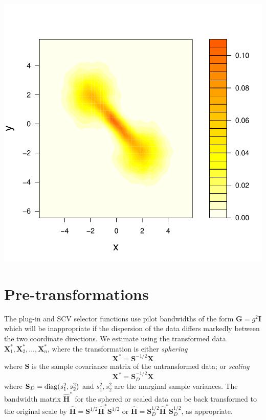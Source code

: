 \documentclass[a4paper,11pt]{article}
\renewcommand{\vec}[1]{\boldsymbol{#1}}
\newcommand{\mat}[1]{\mathbf{#1}}
\def\HH{\mat{H}}
\begin{document}
\begin{center}  
\includegraphics{kde-025}
\end{center}


\section{Pre-transformations}
\label{sec:pre}
The plug-in and SCV selector functions use pilot bandwidths of the 
form $\mat{G} = g^2 \mat{I}$ which will be 
inappropriate if the dispersion of the data differs 
markedly between the two coordinate 
directions. We estimate using the transformed data 
$\vec{X}_1^*, \vec{X}_2^*, 
\dots, \vec{X}_n^*$, where the transformation is either {\em sphering} 
$$\vec{X}^*= \mat{S}^{-1/2} \vec{X}$$
where $\mat{S}$ is the sample covariance matrix of the untransformed data; 
or {\em scaling}
$$\vec{X}^*= \mat{S}_D^{-1/2} \vec{X}$$
where $\mat{S}_D = {\rm diag}(s_{1}^2, s_{2}^2)$ and $s_1^2, s_2^2$ are 
the marginal sample variances. The  
bandwidth matrix $\hat{\HH}^*$
for the sphered or scaled data can be back transformed to the original scale by 
$\hat{\HH} = \mat{S}^{1/2} \hat{\HH}^* \mat{S}^{1/2}$ or 
$\hat{\HH} = 
\mat{S}_D^{1/2} \hat{\HH}^* \mat{S}_D^{1/2}$, as appropriate.
\end{document}
